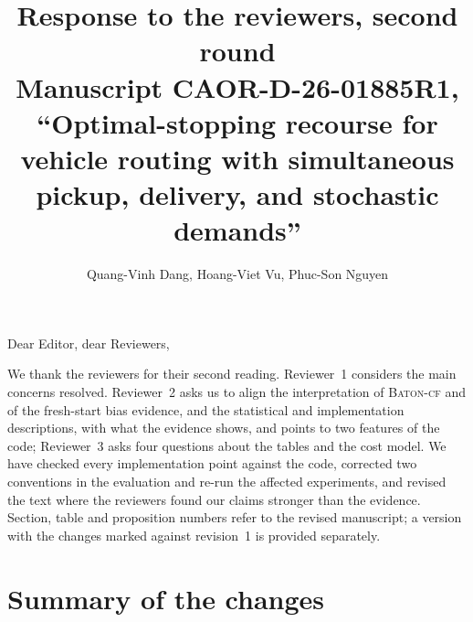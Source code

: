 \documentclass[11pt]{article}
\title{Response to the reviewers, second round\\[4pt]
\large Manuscript CAOR-D-26-01885R1, ``Optimal-stopping recourse for
vehicle routing with simultaneous pickup, delivery, and stochastic
demands''}
\author{Quang-Vinh Dang, Hoang-Viet Vu, Phuc-Son Nguyen}
\date{}
\begin{document}
\maketitle

\noindent Dear Editor, dear Reviewers,

We thank the reviewers for their second reading. Reviewer~1 considers
the main concerns resolved. Reviewer~2 asks us to align the
interpretation of \textsc{Baton-cf} and of the fresh-start bias evidence,
and the statistical and implementation descriptions, with what the
evidence shows, and points to two features of the code; Reviewer~3 asks
four questions about the tables and the cost model. We have checked
every implementation point against the code, corrected two conventions
in the evaluation and re-run the affected experiments, and revised the
text where the reviewers found our claims stronger than the evidence.
Section, table and proposition numbers refer to the revised manuscript;
a version with the changes marked against revision~1 is provided
separately.

\section*{Summary of the changes}
\end{document}
